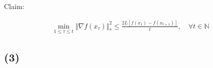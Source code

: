 \documentclass{article}
\begin{document}
\begin{comment}
For any $u, v \in \mathbb{R}^d, \ \lambda \in \mathbb{R}$, we have:

\begin{align*}
    g(\lambda u + (1 - \lambda) v) 
    &= \langle \textcolor{orange}{\nabla f(\lambda u + (1 - \lambda) v)}, \textcolor{Green}{\lambda u + (1 - \lambda) v - x_t} \rangle + \frac{L}{2} \Vert \lambda u + (1 - \lambda) v - x_t \Vert^2 \\
    &= \langle \textcolor{orange}{\nabla f(\lambda u + (1 - \lambda) v)}, \textcolor{Green}{\lambda u} \rangle + \langle \textcolor{orange}{\nabla f(\lambda u + (1 - \lambda) v)}, \textcolor{Green}{(1 - \lambda) v} \rangle - \langle \textcolor{orange}{\nabla f(\lambda u + (1 - \lambda) v)}, \textcolor{Green}{x_t} \rangle \\
    &\qquad + \frac{L}{2} \Vert \lambda u + (1 - \lambda) v - x_t \Vert^2 \\
    &= \langle \nabla f(\lambda u + (1 - \lambda) v), \lambda u \rangle + \langle \nabla f(\lambda u + (1 - \lambda) v), (1 - \lambda) v \rangle - \langle \nabla f(\lambda u + (1 - \lambda) v), x_t \rangle \\
    &= \lambda \langle \nabla f(u), u - x_t \rangle + (1 - \lambda) \langle \nabla f(v), v - x_t \rangle \\
    &= \lambda g(u) + (1 - \lambda) g(v)
\end{align*}
\end{comment}

Claim:

\begin{align*}
    \min_{1 \leq \tau \leq t} \Vert \nabla f ( x_\tau ) \Vert_*^2 \leq \frac{ 2 L \left[ f ( x_1 ) - f ( x_{t + 1} ) \right] }{t} , \quad \forall t \in \mathbb{N}
\end{align*}






\subsection*{(3)}
\end{document}
